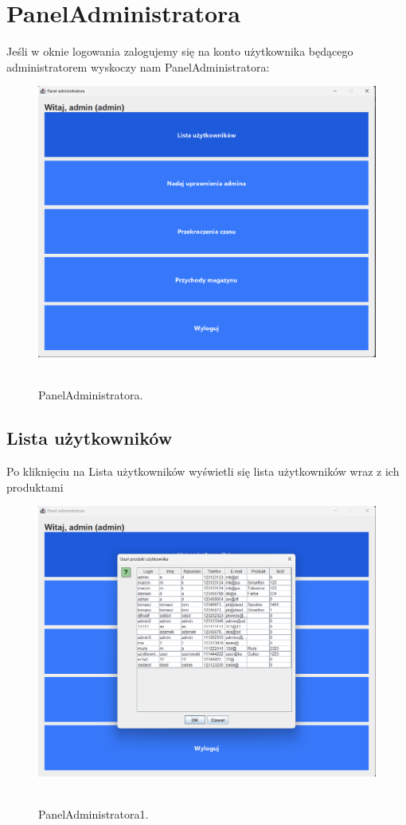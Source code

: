 \section{PanelAdministratora}
\label{sec:PanelAdministratora}

Jeśli w oknie logowania zalogujemy się na konto użytkownika będącego administratorem wyskoczy nam PanelAdministratora:

\begin{figure}[H]
    \centering
    \includegraphics[width=.9\linewidth]{figures/PanelAdministratora.png}\
    \caption{PanelAdministratora.\label{PanelAdministratora}}
\end{figure}

\subsection{Lista użytkowników}
\label{subsec:Lista użytkowników}

Po kliknięciu na Lista użytkowników wyświetli się lista użytkowników wraz z ich produktami

\begin{figure}[H]
    \centering
    \includegraphics[width=.9\linewidth]{figures/PanelAdministratora1.png}\
    \caption{PanelAdministratora1.\label{PanelAdministratora1}}
\end{figure}

